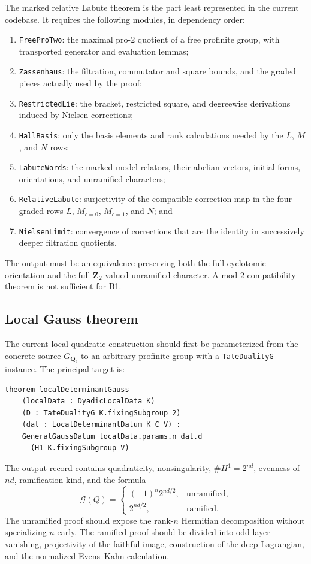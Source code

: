 \documentclass[11pt,reqno]{amsart}
\theoremstyle{definition}
\theoremstyle{remark}
\numberwithin{equation}{section}
\newcommand{\Q}{\mathbf Q}
\newcommand{\Z}{\mathbf Z}
\newcommand{\Gsum}{\mathcal G}
\begin{document}
The marked relative Labute theorem is the part least represented in the
current codebase.  It requires the following modules, in dependency order:
\begin{enumerate}
\item \texttt{FreeProTwo}: the maximal pro-\(2\) quotient of a free
profinite group, with transported generator and evaluation lemmas;
\item \texttt{Zassenhaus}: the filtration, commutator and square bounds,
and the graded pieces actually used by the proof;
\item \texttt{RestrictedLie}: the bracket, restricted square, and
degreewise derivations induced by Nielsen corrections;
\item \texttt{HallBasis}: only the basis elements and rank calculations
needed by the \(L\), \(M\), and \(N\) rows;
\item \texttt{LabuteWords}: the marked model relators, their abelian
vectors, initial forms, orientations, and unramified characters;
\item \texttt{RelativeLabute}: surjectivity of the compatible correction
map in the four graded rows \(L\), \(M_{\epsilon=0}\),
\(M_{\epsilon=1}\), and \(N\); and
\item \texttt{NielsenLimit}: convergence of corrections that are the
identity in successively deeper filtration quotients.
\end{enumerate}
The output must be an equivalence preserving both the full cyclotomic
orientation and the full \(\Z_2\)-valued unramified character.  A
mod-\(2\) compatibility theorem is not sufficient for B1.

\subsection{Local Gauss theorem}

The current local quadratic construction should first be parameterized
from the concrete source \(G_{\Q_2}\) to an arbitrary profinite group with
a \texttt{TateDualityG} instance.  The principal target is:
\begin{verbatim}
theorem localDeterminantGauss
    (localData : DyadicLocalData K)
    (D : TateDualityG K.fixingSubgroup 2)
    (dat : LocalDeterminantDatum K C V) :
    GeneralGaussDatum localData.params.n dat.d
      (H1 K.fixingSubgroup V)
\end{verbatim}
The output record contains quadraticity, nonsingularity,
\(\#H^1=2^{nd}\), evenness of \(nd\), ramification kind, and the formula
\[
 \Gsum(Q)=
 \begin{cases}
 (-1)^n2^{nd/2},&\text{unramified},\\
 2^{nd/2},&\text{ramified}.
 \end{cases}
\]
The unramified proof should expose the rank-\(n\) Hermitian decomposition
without specializing \(n\) early.  The ramified proof should be divided
into odd-layer vanishing, projectivity of the faithful image, construction
of the deep Lagrangian, and the normalized Evens--Kahn calculation.
\end{document}
